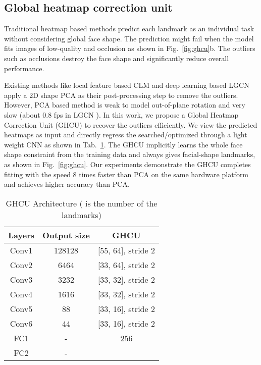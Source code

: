 \documentclass[10pt,twocolumn,letterpaper]{article}
\begin{document}
{{		\subsection{Global heatmap correction unit}


		Traditional heatmap based methods predict each landmark as an individual task without considering global face shape. 
		The prediction might fail when the model fits images of low-quality and occlusion as shown in Fig.~\ref{fig:ghcu}b.
		{The outliers such as occlusions} destroy the face shape and significantly reduce overall performance.
		
		Existing methods like local feature based CLM \cite{cristinacce2008automatic} and deep learning based 
		LGCN \cite{merget2018robust} apply a 2D shape PCA as their post-processing step to remove the outliers. However, PCA based method is 
		weak to model out-of-plane rotation and very slow (about 0.8 fps in LGCN \cite{merget2018robust}). In this work, 
		we propose a Global Heatmap Correction Unit (GHCU) to recover the outliers  efficiently. We 
		view the predicted heatmaps as input and directly regress 
{the searched/optimized}
		 through a 
		light weight CNN {as shown in Tab.~\ref{table_ghcu_arch}}. The GHCU implicitly learns the {whole} face shape constraint from the  training data and always gives facial-shape landmarks, 
		as shown in Fig.~\ref{fig:ghcu}. {Our experiments demonstrate the GHCU completes fitting with 
			the	speed 8 times faster than PCA on the same hardware platform and achieves higher accuracy than PCA.}
		


		\begin{table}[!t]
			\centering
			\caption{GHCU Architecture ( is the number of the landmarks)}
			\vspace{3pt}
			\footnotesize
			\label{table_ghcu_arch}
			\begin{tabular}{c|c|c}
				\hline
				Layers  & Output size & GHCU \\
				\hline
				Conv1 & 128128 & [55, 64], stride 2 \\
				Conv2 & 6464 & [33, 64], stride 2 \\
				Conv3 & 3232 & [33, 32], stride 2 \\
				Conv4 & 1616 & [33, 32], stride 2 \\
				Conv5 & 88 & [33, 16], stride 2 \\
				Conv6 & 44 & [33, 16], stride 2 \\
				\hline
				FC1   & - & 256 \\
				FC2   & - &   \\      
				\hline
			\end{tabular}
		\end{table} 
		
}}
\end{document}
